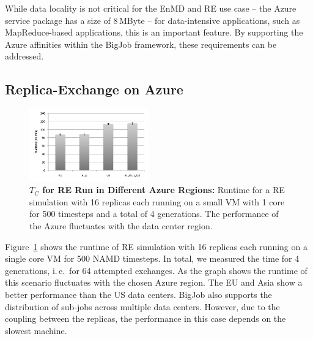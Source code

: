 \documentclass[conference,final]{IEEEtran}
\newcommand{\tc}{$T_{C}$ }
\begin{document}
While data locality is not critical for the EnMD and RE use case --
the Azure service package has a size of 8\,MByte -- for data-intensive
applications, such as MapReduce-based applications, this is an important
feature. By supporting the Azure affinities within the BigJob framework,
these requirements can be addressed.

\subsection{Replica-Exchange on Azure}

\begin{figure}[htbp]
    \centering
        \includegraphics[width=0.46\textwidth]{performance/repex_runtime_per_region.pdf}
    \caption{\textbf{\tc for RE Run in Different Azure Regions:} Runtime for a RE simulation with 
    16 replicas each running on a small VM with 1 core for 500 timesteps and a total of 4 generations. The performance of
    the Azure fluctuates with the data center region. }
    \label{fig:performance_repex_runtime_per_region}
\end{figure}

Figure~\ref{fig:performance_repex_runtime_per_region} shows the runtime of RE simulation
with 16 replicas each running on a single core VM for 500 NAMD timesteps. In total, we measured
the time for 4 generations, i.\,e.\ for 64 attempted exchanges. As the graph shows the runtime
of this scenario fluctuates with the chosen Azure region. The EU and Asia show a better performance
than the US data centers. BigJob also supports the distribution of sub-jobs across multiple data 
centers. However, due to the coupling between the replicas, the performance in this case
depends on the slowest machine.
\end{document}
